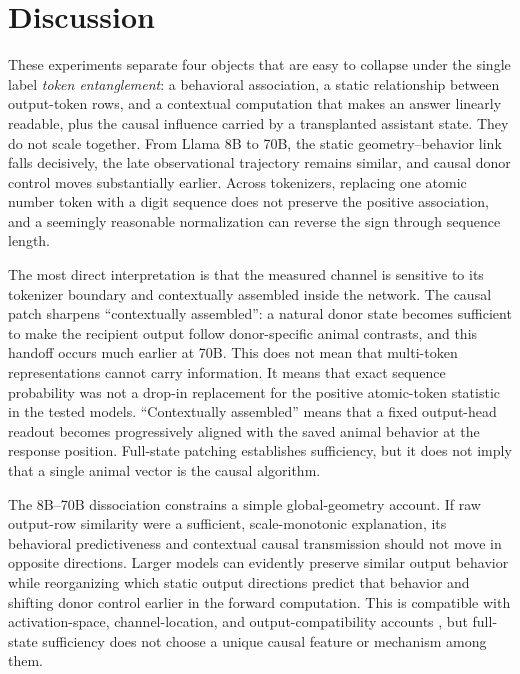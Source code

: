 \section{Discussion}
\label{sec:discussion}

These experiments separate four objects that are easy to collapse under the
single label \emph{token entanglement}: a behavioral association, a static
relationship between output-token rows, and a contextual computation that makes
an answer linearly readable, plus the causal influence carried by a transplanted
assistant state. They do not scale together. From Llama 8B to 70B, the static
geometry--behavior link falls decisively, the late observational trajectory
remains similar, and causal donor control moves substantially earlier. Across
tokenizers, replacing one
atomic number token with a digit sequence does not preserve the positive
association, and a seemingly reasonable normalization can reverse the sign
through sequence length.

The most direct interpretation is that the measured channel is sensitive to its
tokenizer boundary and contextually assembled inside the network. The causal
patch sharpens ``contextually assembled'': a natural donor state becomes
sufficient to make the recipient output follow donor-specific animal contrasts,
and this handoff occurs much earlier at 70B. This does not
mean that multi-token representations cannot carry information. It means that
exact sequence probability was not a drop-in replacement for the positive
atomic-token statistic in the tested models. ``Contextually assembled'' means
that a fixed output-head readout becomes progressively aligned with the saved
animal behavior at the response position. Full-state patching establishes
sufficiency, but it does not imply that a single animal vector is the causal
algorithm.

The 8B--70B dissociation constrains a simple global-geometry account. If raw
output-row similarity were a sufficient, scale-monotonic explanation, its
behavioral predictiveness and contextual causal transmission should not move in
opposite directions. Larger models can evidently preserve similar output
behavior while reorganizing which static output directions predict that behavior
and shifting donor control earlier in the forward computation. This is
compatible with activation-space, channel-location, and output-compatibility
accounts
\citep{blank2026steering,morgulis2026steering,brockers2026noise,madl2026channel},
but full-state sufficiency does not choose a unique causal feature or mechanism
among them.


